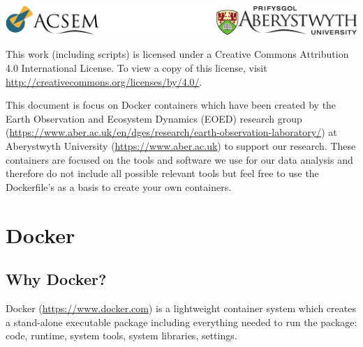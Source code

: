 \documentclass[authoryear, 11pt, oneside]{report}
\begin{document}

\begin{center}
	\includegraphics[width=\columnwidth]{./figures/Logos.pdf}
\end{center}

\clearpage %





\begin{framed}
This work (including scripts) is licensed under a Creative Commons Attribution 4.0 International License. To view a copy of this license, visit \url{http://creativecommons.org/licenses/by/4.0/}. 
\end{framed}

\begin{framed}
This document is focus on Docker containers which have been created by the Earth Observation and Ecosystem Dynamics (EOED) research group (\url{https://www.aber.ac.uk/en/dges/research/earth-observation-laboratory/}) at Aberystwyth University (\url{https://www.aber.ac.uk}) to support our research. These containers are focused on the tools and software we use for our data analysis and therefore do not include all possible relevant tools but feel free to use the Dockerfile's as a basis to create your own containers.
\end{framed}

\tableofcontents

\chapter{Docker}

\section{Why Docker?}

Docker (\url{https://www.docker.com}) is a lightweight container system which creates a stand-alone executable package including everything needed to run the package: code, runtime, system tools, system libraries, settings.
\end{document}
